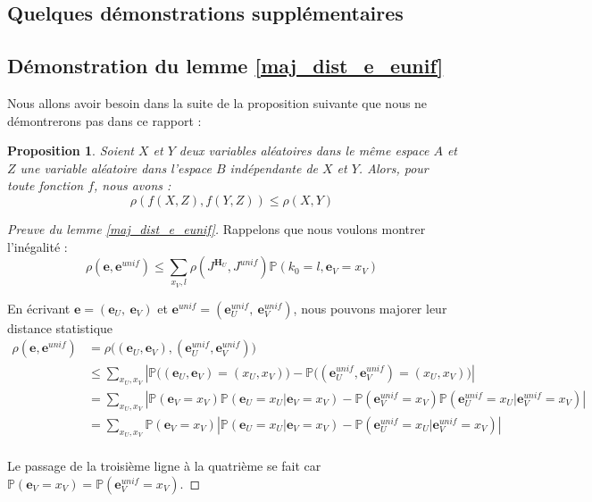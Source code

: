 \documentclass[12pt]{article}
\theoremstyle{plain}
\newtheorem{propo}[thm]{Proposition}
\newcommand{\e}{\mathbf{e}}
\begin{document}
\begin{appendix}
\section*{Quelques démonstrations supplémentaires}

\subsection*{Démonstration du lemme \ref{maj_dist_e_eunif}}

Nous allons avoir besoin dans la suite de la proposition suivante que nous ne démontrerons pas dans ce rapport :
\begin{propo}\label{rho_f}
Soient $X$ et $Y$ deux variables aléatoires dans le même espace $A$ et $Z$ une variable aléatoire dans l'espace $B$ indépendante de $X$ et $Y$. Alors, pour toute fonction $f$, nous avons : $$ \rho(f(X,Z),f(Y,Z)) \leq \rho(X,Y)$$
\end{propo}

\begin{proof}[Preuve du lemme \ref{maj_dist_e_eunif}]
Rappelons que nous voulons montrer l’inégalité :
$$ \rho\left(\e ,\e^{unif}\right) \leq \sum\limits_{x_V,l} \rho\left(J^{\mathbf{H}_U},J^{unif}\right)\mathbb{P}\left(k_0 = l, \e_V = x_V\right) $$ 

\noindent En écrivant $\e = (\e_U,\ \e_V)$ et $\e^{unif} = (\e_U^{unif},\ \e_V^{unif})$, nous pouvons majorer leur distance statistique
{\scriptsize
\begin{equation*}
\begin{split}
\rho(\e,\e^{unif}) &= \rho\Big((\e_U,\e_V),(\e_U^{unif},\e_V^{unif})\Big)\\
&\leq \sum\limits_{x_U,x_V} \left|\mathbb{P}\Big((\e_U,\e_V)=(x_U,x_V)\Big) - \mathbb{P}\Big((\e_U^{unif},\e_V^{unif})=(x_U,x_V)\Big)\right|\\
&= \sum\limits_{x_U,x_V} \left|\mathbb{P}(\e_V = x_V)\mathbb{P}(\e_U=x_U|\e_V=x_V) - \mathbb{P}(\e_V^{unif} = x_V)\mathbb{P}(\e_U^{unif}=x_U | \e_V^{unif}=x_V)\right|\\
&= \sum\limits_{x_U,x_V} \mathbb{P}(\e_V = x_V)\left|\mathbb{P}(\e_U=x_U|\e_V=x_V) - \mathbb{P}(\e_U^{unif}=x_U | \e_V^{unif}=x_V)\right|\\
\end{split}
\end{equation*}}

\noindent Le passage de la troisième ligne à la quatrième se fait car $\mathbb{P}(\e_V = x_V) = \mathbb{P}(\e_V^{unif} = x_V) $.


\end{proof}
\end{appendix}
\end{document}
